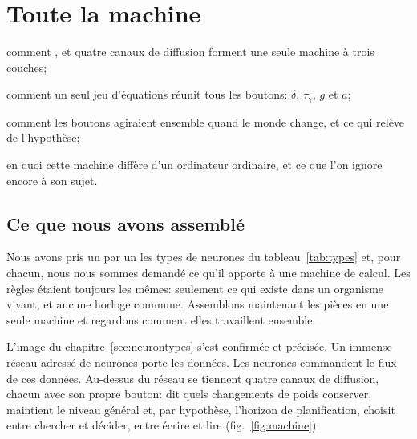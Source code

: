 \chapter{Toute la machine}
\label{sec:synthesis}
\begin{chaptergoals}
\item comment ,  et quatre canaux de diffusion forment une seule machine à trois couches;
\item comment un seul jeu d'équations réunit tous les boutons: $\delta$, $\tau_\gamma$, $g$ et $a$;
\item comment les boutons agiraient ensemble quand le monde change, et ce qui relève de l'hypothèse;
\item en quoi cette machine diffère d'un ordinateur ordinaire, et ce que l'on ignore encore à son sujet.
\end{chaptergoals}

\section{Ce que nous avons assemblé}

Nous avons pris un par un les types de neurones du tableau~\ref{tab:types} et, pour chacun, nous nous sommes demandé ce qu'il apporte à une machine de calcul. Les règles étaient toujours les mêmes: seulement ce qui existe dans un organisme vivant, et aucune horloge commune. Assemblons maintenant les pièces en une seule machine et regardons comment elles travaillent ensemble.

L'image du chapitre~\ref{sec:neurontypes} s'est confirmée et précisée. Un immense réseau adressé de neurones  porte les données. Les neurones  commandent le flux de ces données. Au-dessus du réseau se tiennent quatre canaux de diffusion, chacun avec son propre bouton:  dit quels changements de poids conserver,  maintient le niveau général et, par hypothèse, l'horizon de planification,  choisit entre chercher et décider,  entre écrire et lire (fig.~\ref{fig:machine}).

